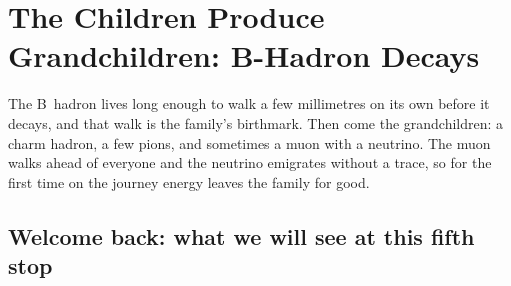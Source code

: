 \providecommand{\Bstarbar}{\ensuremath{\bar B^{*0}}\xspace}
\providecommand{\Bstar}{\ensuremath{B^{*0}}\xspace}
\providecommand{\Bbar}{\ensuremath{\bar B^0}\xspace}
\providecommand{\Bz}{\ensuremath{B^0}\xspace}
\providecommand{\um}{\ensuremath{\,\mu\mathrm{m}}\xspace}
\providecommand{\mm}{\ensuremath{\,\mathrm{mm}}\xspace}
\providecommand{\ps}{\ensuremath{\,\mathrm{ps}}\xspace}
\providecommand{\Lxy}{\ensuremath{L_{xy}}\xspace}
\providecommand{\dzero}{\ensuremath{d_0}\xspace}
\providecommand{\tauz}{\ensuremath{\tau_0}\xspace}
\chapter{The Children Produce Grandchildren: B-Hadron Decays}
\label{ch:children_producing_grandchildren}

\begin{journeybox}
The B~hadron lives long enough to walk a few millimetres on its own before it
decays, and that walk is the family's birthmark. Then come the grandchildren:
a charm hadron, a few pions, and sometimes a muon with a neutrino. The muon
walks ahead of everyone and the neutrino emigrates without a trace, so for the
first time on the journey energy leaves the family for good.
\end{journeybox}


\section{Welcome back: what we will see at this fifth stop}
\label{sec:children_producing_grandchildren:what_we_compute}

